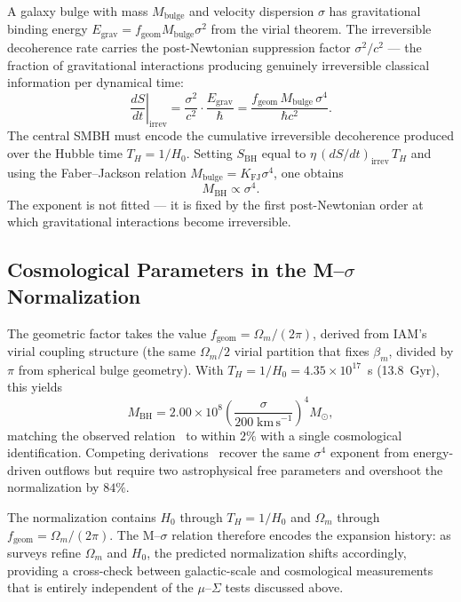 \documentclass[twocolumn,a4paper,aps,prd,twocolumn,showpacs,notitlepage,superscriptaddress,nofootinbib]{article}
\newcommand{\betam}{\beta_{m}}
\begin{document}
A galaxy bulge with mass $M_\mathrm{bulge}$ and velocity dispersion $\sigma$
has gravitational binding energy $E_\mathrm{grav} = f_\mathrm{geom}
M_\mathrm{bulge}\sigma^2$ from the virial theorem.  The irreversible
decoherence rate carries the post-Newtonian suppression factor $\sigma^2/c^2$
--- the fraction of gravitational interactions producing genuinely irreversible
classical information per dynamical time:
\begin{equation}
  \left.\frac{dS}{dt}\right|_\mathrm{irrev}
  = \frac{\sigma^2}{c^2}\cdot\frac{E_\mathrm{grav}}{\hbar}
  = \frac{f_\mathrm{geom}\,M_\mathrm{bulge}\,\sigma^4}{\hbar c^2}.
  \label{eq:decoherence_rate}
\end{equation}
The central SMBH must encode the cumulative irreversible decoherence produced
over the Hubble time $T_H = 1/H_0$.  Setting $S_\mathrm{BH}$ equal to
$\eta\,(dS/dt)_\mathrm{irrev}\,T_H$ and using the Faber--Jackson relation
$M_\mathrm{bulge} = K_\mathrm{FJ}\sigma^4$, one obtains
\begin{equation}
  M_\mathrm{BH} \propto \sigma^4.
  \label{eq:msigma_exponent}
\end{equation}
The exponent is not fitted --- it is fixed by the first post-Newtonian order
at which gravitational interactions become irreversible.

\subsection{Cosmological Parameters in the M--$\sigma$ Normalization}

The geometric factor takes the value $f_\mathrm{geom} = \Omega_m/(2\pi)$,
derived from IAM's virial coupling structure (the same $\Omega_m/2$ virial
partition that fixes $\betam$, divided by $\pi$ from spherical bulge
geometry).  With $T_H = 1/H_0 = 4.35\times10^{17}$~s (13.8~Gyr), this yields
\begin{equation}
  M_\mathrm{BH} = 2.00\times10^8\!
  \left(\frac{\sigma}{200\;\mathrm{km\,s}^{-1}}\right)^{\!4}\!M_\odot,
  \label{eq:msigma_norm}
\end{equation}
matching the observed relation~\citep{McConnell2013} to within $2\%$ with a
single cosmological identification.  Competing derivations~\citep{King2003}
recover the same $\sigma^4$ exponent from energy-driven outflows but require
two astrophysical free parameters and overshoot the normalization by $84\%$.

The normalization contains $H_0$ through $T_H = 1/H_0$ and $\Omega_m$ through
$f_\mathrm{geom} = \Omega_m/(2\pi)$.  The M--$\sigma$ relation therefore
encodes the expansion history: as surveys refine $\Omega_m$ and $H_0$, the
predicted normalization shifts accordingly, providing a cross-check between
galactic-scale and cosmological measurements that is entirely independent of
the $\mu$--$\Sigma$ tests discussed above.
\end{document}
